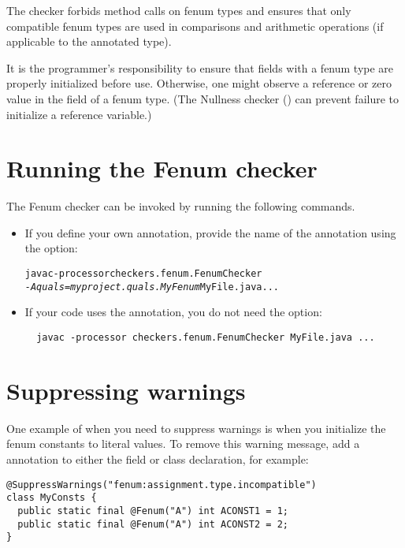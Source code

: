 The checker forbids method calls on fenum types and ensures that
only compatible fenum types are used in comparisons and arithmetic operations
(if applicable to the annotated type).

It is the programmer's responsibility to ensure that fields with a fenum type
are properly initialized before use.  Otherwise, one might observe a 
reference or zero value in the field of a fenum type.  (The Nullness checker
() can prevent failure to initialize a
reference variable.)


\section{Running the Fenum checker\label{fenum-running}}

The Fenum checker can be invoked by running the following commands.

\begin{itemize}
  \item 
If you define your own annotation, provide the name of the annotation using the
 option:

\begin{alltt}
  javac -processor checkers.fenum.FenumChecker
        \textit{-Aquals=myproject.quals.MyFenum} MyFile.java ...
\end{alltt}


\item
If your code uses the  annotation, you do
not need the  option:

\begin{Verbatim}
  javac -processor checkers.fenum.FenumChecker MyFile.java ...
\end{Verbatim}

\end{itemize}



\section{Suppressing warnings\label{fenum-suppressing}}

One example of when you need to suppress warnings is when you initialize the
fenum constants to literal values.
To remove this warning message, add a  annotation to either
the field or class declaration, for example:

\begin{Verbatim}
@SuppressWarnings("fenum:assignment.type.incompatible")
class MyConsts {
  public static final @Fenum("A") int ACONST1 = 1;
  public static final @Fenum("A") int ACONST2 = 2;  
}
\end{Verbatim}



